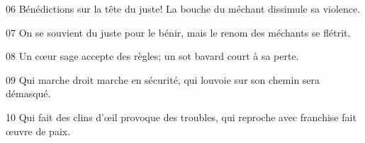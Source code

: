 
06 Bénédictions sur la tête du juste! La bouche du méchant dissimule sa violence.

07 On se souvient du juste pour le bénir, mais le renom des méchants se flétrit.

08 Un cœur sage accepte des règles; un sot bavard court à sa perte.

09 Qui marche droit marche en sécurité, qui louvoie sur son chemin sera démasqué.

10 Qui fait des clins d’œil provoque des troubles, qui reproche avec franchise fait œuvre de paix.
